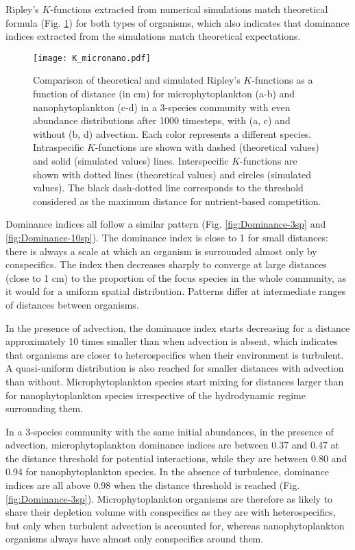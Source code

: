 \documentclass[12pt,english]{article}
\begin{document}
Ripley's $K$-functions extracted from numerical simulations match
theoretical formula (Fig. \ref{fig:Ripley's-K-function}) for both
types of organisms, which also indicates that dominance indices extracted
from the simulations match theoretical expectations.

\begin{figure}[H]
\begin{centering}
\texttt{[image: K\_micronano.pdf]} 
\par\end{centering}
\caption{Comparison of theoretical and simulated Ripley's $K$-functions as
a function of distance (in cm) for microphytoplankton (a-b) and nanophytoplankton
(c-d) in a 3-species community with even abundance distributions after
1000 timesteps, with (a, c) and without (b, d) advection. Each color
represents a different species. Intraspecific $K$-functions are shown
with dashed (theoretical values) and solid (simulated values) lines.
Interspecific $K$-functions are shown with dotted lines (theoretical
values) and circles (simulated values). The black dash-dotted line
corresponds to the threshold considered as the maximum distance for
nutrient-based competition.\label{fig:Ripley's-K-function}}
\end{figure}

Dominance indices all follow a similar pattern (Fig. \ref{fig:Dominance-3sp}
and \ref{fig:Dominance-10sp}). The dominance index is close to 1
for small distances: there is always a scale at which an organism
is surrounded almost only by conspecifics. The index then decreases
sharply to converge at large distances (close to 1 cm) to the proportion
of the focus species in the whole community, as it would for a uniform
spatial distribution. Patterns differ at intermediate ranges of distances
between organisms.

In the presence of advection, the dominance index starts decreasing
for a distance approximately 10 times smaller than when advection is absent, which indicates that organisms are closer to heterospecifics when their environment is turbulent. A quasi-uniform distribution is also reached for smaller distances with advection than without. Microphytoplankton species start mixing for distances larger than for nanophytoplankton species irrespective of the hydrodynamic regime surrounding them. 

In a 3-species community with the same initial abundances, in the
presence of advection, microphytoplankton dominance indices are between
0.37 and 0.47 at the distance threshold for potential interactions,
while they are between 0.80 and 0.94 for nanophytoplankton species.
In the absence of turbulence, dominance indices are all above 0.98
when the distance threshold is reached (Fig. \ref{fig:Dominance-3sp}).
Microphytoplankton organisms are therefore as likely to share their
depletion volume with conspecifics as they are with heterospecifics,
but only when turbulent advection is accounted for, whereas nanophytoplankton
organisms always have almost only conspecifics around them.
\end{document}
